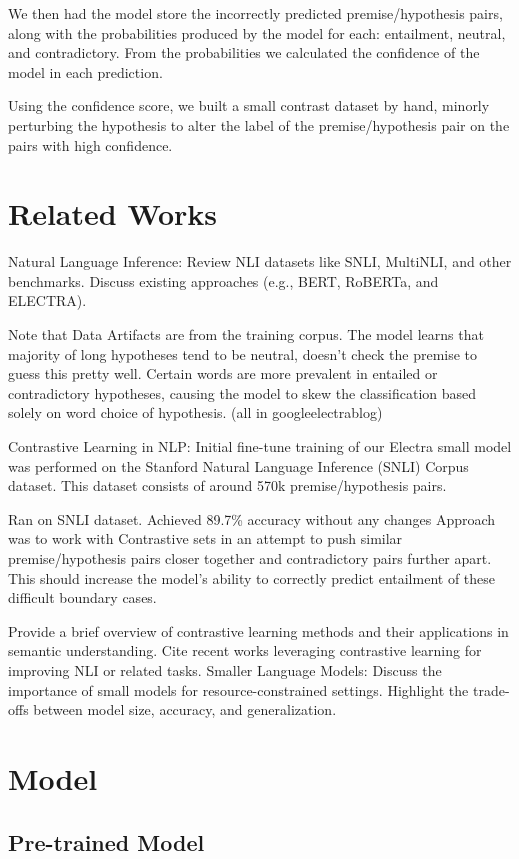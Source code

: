\documentclass[11pt]{article}
\begin{document}
We then had the model store the incorrectly predicted premise/hypothesis pairs, along with the probabilities produced by the model for each: entailment, neutral, and contradictory. From the probabilities we calculated the confidence of the model in each prediction.

Using the confidence score, we built a small contrast dataset by hand, minorly perturbing the hypothesis to alter the label of the premise/hypothesis pair on the pairs with high confidence.   

\citealp{premise4granted}
\section{Related Works}
Natural Language Inference:
Review NLI datasets like SNLI, MultiNLI, and other benchmarks.
Discuss existing approaches (e.g., BERT, RoBERTa, and ELECTRA).

Note that Data Artifacts are from the training corpus. The model learns that majority of long hypotheses tend to be neutral, doesn't check the premise to guess this pretty well. Certain words are more prevalent in entailed or contradictory hypotheses, causing the model to skew the classification based solely on word choice of hypothesis.  (all in googleelectrablog)

Contrastive Learning in NLP:
Initial fine-tune training of our Electra small model was performed on the Stanford Natural Language Inference (SNLI) Corpus dataset. This dataset consists of around 570k premise/hypothesis pairs. \citealp{snlicorpus}

Ran on SNLI dataset. Achieved 89.7\% accuracy without any changes
Approach was to work with Contrastive sets in an attempt to push similar premise/hypothesis pairs closer together and contradictory pairs further apart. This should increase the model's ability to correctly predict entailment of these difficult boundary cases.

Provide a brief overview of contrastive learning methods and their applications in semantic understanding.
Cite recent works leveraging contrastive learning for improving NLI or related tasks.
Smaller Language Models:
Discuss the importance of small models for resource-constrained settings.
Highlight the trade-offs between model size, accuracy, and generalization.

\section{Model}
\subsection{Pre-trained Model}
\end{document}
